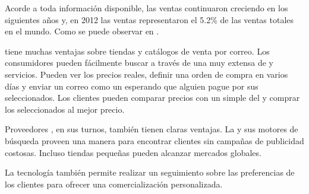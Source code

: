 

Acorde a toda información disponible, las ventas \ecommerce continuaron creciendo en los siguientes años y, en 2012 las ventas \ecommerce representaron el 5.2\% de las ventas totales en el mundo. Como se puede observar en .

\ecommerce tiene muchas ventajas sobre tiendas \brickandmortar y catálogos de venta por correo. Los consumidores pueden fácilmente buscar a través de una \dataBaseDB muy extensa de \itemsCOM y servicios. Pueden ver los precios reales, definir una orden de compra en varios días y enviar un correo como un \wishlist esperando que alguien pague por sus \itemsCOM seleccionados. Los clientes pueden comparar precios con un simple \click del \mouse y comprar los \itemsCOM seleccionados al mejor precio.

Proveedores \online, en sus turnos, también tienen claras ventajas. La \webINT y sus motores de búsqueda proveen una manera para encontrar clientes sin campañas de publicidad costosas. Incluso tiendas \online pequeñas pueden alcanzar mercados globales. 

La tecnología \webINT también permite realizar un seguimiento sobre las preferencias de los clientes para ofrecer una comercialización personalizada.

